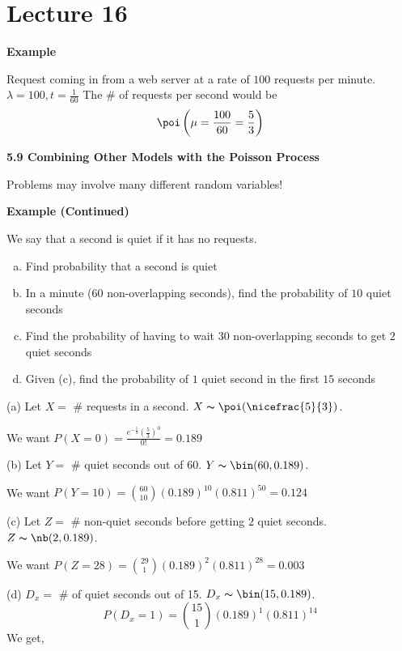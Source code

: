 \section{Lecture 16}
\textbf{Example}

Request coming in from a web server at a rate of $ 100 $ requests per minute.
$ \lambda = 100, t=\frac{1}{60} $
The \# of requests per second would be
\[ \poi\left(\mu=\frac{100}{60}=\frac{5}{3}\right) \]

\textbf{5.9 Combining Other Models with the Poisson Process}

Problems may involve many different random variables!

\textbf{Example (Continued)}

We say that a second is quiet if it has no requests.
\begin{enumerate}[(a)]
    \item Find probability that a second is quiet
    \item In a minute ($60$ non-overlapping seconds), find the probability of $10$ quiet seconds
    \item Find the probability of having to wait $ 30 $ non-overlapping seconds to get $ 2 $ quiet seconds
    \item Given (c), find the probability of $ 1 $ quiet second in the first $ 15 $ seconds
\end{enumerate}
(a) Let $ X= $ \# requests in a second. $ X \thicksim \poi(\nicefrac{5}{3}) $.

We want $ P(X=0)=\frac{e^{-\frac{5}{3}}\left(\frac{5}{3}\right)^0}{0!}=0.189 $


(b) Let $ Y= $ \# quiet seconds out of 60. $ Y \thicksim \bin(60,0.189) $.

We want $ P(Y=10)=\binom{60}{10}(0.189)^{10}(0.811)^{50}=0.124 $

(c) Let $ Z= $ \# non-quiet seconds before getting $ 2 $ quiet seconds. 
$ Z \thicksim \nb(2,0.189) $.

We want $ P(Z=28)=\binom{29}{1}(0.189)^2(0.811)^{28}=0.003 $

(d) $ D_x=$ \# of quiet seconds out of 15. $ D_x \thicksim \bin(15,0.189) $.
\[ P(D_x=1)=\binom{15}{1}(0.189)^1(0.811)^{14} \]
We get,

